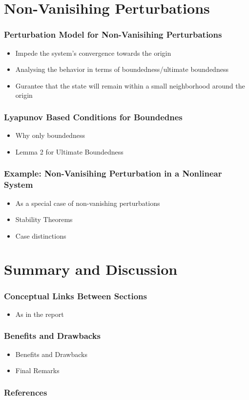 \documentclass[student, noshadow, lsr, english, aspectratio=169]{ITR_LSR_slides}
\begin{document}
\section{Non-Vanisihing Perturbations}

\begin{frame}
	\frametitle{Perturbation Model for Non-Vanisihing Perturbations}
	\begin{itemize}
		\item Impede the system's convergence towards the origin
		\item Analysing the behavior in terms of boundedness/ultimate boundedness
		\item Gurantee that the state will remain within a small neighborhood around the origin
	\end{itemize}
\end{frame}

\begin{frame}
	\frametitle{Lyapunov Based Conditions for Boundednes}
	\begin{itemize}
		\item Why only boundedness
		\item Lemma 2 for Ultimate Boundedness
	\end{itemize}
\end{frame}

\begin{frame}
	\frametitle{Example: Non-Vanisihing Perturbation in a Nonlinear System}
	\begin{itemize}
		\item As a special case of non-vanishing perturbations
		\item Stability Theorems
		\item Case distinctions
	\end{itemize}
\end{frame}

\section{Summary and Discussion}

\begin{frame}
	\frametitle{Conceptual Links Between Sections}
	\begin{itemize}
		\item As in the report
	\end{itemize}
\end{frame}

\begin{frame}
	\frametitle{Benefits and Drawbacks}
	\begin{itemize}
		\item Benefits and Drawbacks
		\item Final Remarks
	\end{itemize}
\end{frame}


\begin{frame}[allowframebreaks]
    \frametitle{References}
    \nocite{*} 
    \printbibliography[heading=none]
\end{frame}
\end{document}
